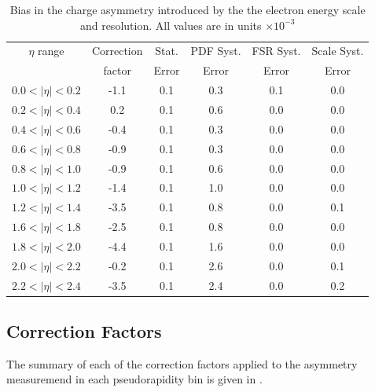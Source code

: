 \begin{table}[htbp]
  \begin{center}
    \begin{tabular}{cccccc}
\toprule
$\eta$ range & Correction  & Stat.   &PDF  Syst. &  FSR Syst. & Scale Syst.\\
          & factor & Error & Error   & Error  & Error  \\
     \midrule
 $0.0<|\eta|<0.2$ & -1.1 & 0.1 & 0.3  &0.1 & 0.0\\
 $0.2<|\eta|<0.4$ &  0.2 & 0.1 & 0.6  &0.0 & 0.0\\
 $0.4<|\eta|<0.6$ & -0.4 & 0.1 & 0.3  &0.0 & 0.0\\
 $0.6<|\eta|<0.8$ & -0.9 & 0.1 & 0.3  &0.0 & 0.0\\
 $0.8<|\eta|<1.0$ & -0.9 & 0.1 & 0.6  &0.0 & 0.0\\
 $1.0<|\eta|<1.2$ & -1.4 & 0.1 & 1.0  &0.0 & 0.0\\
 $1.2<|\eta|<1.4$ & -3.5 & 0.1 & 0.8  &0.0 & 0.1\\
 $1.6<|\eta|<1.8$ & -2.5 & 0.1 & 0.8  &0.0 & 0.0\\
 $1.8<|\eta|<2.0$ & -4.4 & 0.1 & 1.6  &0.0 & 0.0\\
 $2.0<|\eta|<2.2$ & -0.2 & 0.1 & 2.6  &0.0 & 0.1\\
 $2.2<|\eta|<2.4$ & -3.5 & 0.1 & 2.4  &0.0 & 0.2\\
\bottomrule
    \end{tabular}
    \caption{\label{tab:energyscalecorr}Bias in the charge asymmetry introduced by the the electron energy scale and resolution.
 All values are in units $\times 10^{-3}$}
  \end{center}
\end{table}

\subsection{Correction Factors}
The summary of each of the correction factors applied to the asymmetry
measuremend in each pseudorapidity bin is given in
. 

